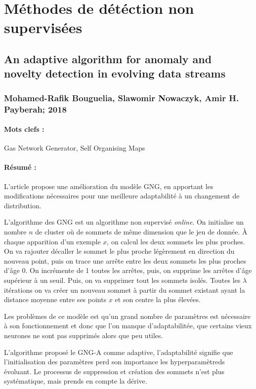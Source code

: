 \documentclass[11pt,a4paper]{report}
\begin{document}
\newpage






\section{Méthodes de détéction non supervisées}

\subsection{An adaptive algorithm for anomaly and novelty detection in evolving data streams}
\subsubsection{Mohamed-Rafik Bouguelia, Slawomir Nowaczyk, Amir H. Payberah; 2018}

\paragraph{Mots clefs :}Gas Network Generator, Self Organising Maps

\paragraph{Résumé :}L'article propose une amélioration du modèle GNG, en apportant les modifications nécessaires pour une meilleure adaptabilité à un changement de distribution.

L'algorithme des GNG est un algorithme non supervisé \textit{online}. On initialise un nombre $n$ de cluster où de sommets de même dimension que le jeu de donnée. À chaque apparition d'un exemple $x$, on calcul les deux sommets les plus proches. On va rajouter décaller le sommet le plus proche légèrement en direction du nouveau point, puis on trace une arrête entre les deux sommets les plus proches d'âge 0. On incrémente de 1 toutes les arrêtes, puis, on supprime les arrêtes d'âge supérieur à un seuil. Puis, on va supprimer tout les sommets isolés. Toutes les $\lambda$ itérations on va créer un nouveau sommet à partir du sommet existant ayant la distance moyenne entre ses points $x$ et son centre la plus élevées.

Les problèmes de ce modèle est qu'un grand nombre de paramètres est nécessaire à son fonctionnement et donc que l'on manque d'adaptabilitée, que certains vieux neurones ne sont pas supprimés alors que peu utiles.

L'algorithme proposé le GNG-A comme adaptive, l'adaptabilité signifie que l'initialisation des paramètres perd son importance les hyperparamètreds évoluant. Le processus de suppression et création des sommets n'est plus systématique, mais prends en compte la dérive. 
\end{document}
